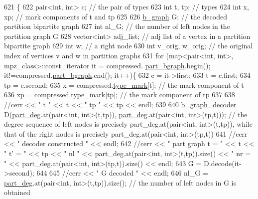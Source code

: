 \begin{DoxyCode}
621 \{
622   pair<int, int> c; \textcolor{comment}{// the pair of types}
623   \textcolor{keywordtype}{int} t, tp; \textcolor{comment}{// types}
624   \textcolor{keywordtype}{int} x, xp; \textcolor{comment}{// mark components of t and tp}
625 
626   \hyperlink{classb__graph}{b\_graph} G; \textcolor{comment}{// the decoded partition bipartite graph}
627   \textcolor{keywordtype}{int} nl\_G; \textcolor{comment}{// the number of left nodes in the partition graph G }
628   vector<int> adj\_list; \textcolor{comment}{// adj list of a vertex in a partition bipartite graph}
629   \textcolor{keywordtype}{int} w; \textcolor{comment}{// a right node}
630   \textcolor{keywordtype}{int} v\_orig, w\_orig; \textcolor{comment}{// the original index of vertices v and w in partition graphs }
631   \textcolor{keywordflow}{for} (map<pair<int, int>, mpz\_class>::const\_iterator it = compressed.
      \hyperlink{classmarked__graph__compressed_a7b3267063fba30b45eb21b3ba4e07536}{part\_bgraph}.begin(); it!=compressed.\hyperlink{classmarked__graph__compressed_a7b3267063fba30b45eb21b3ba4e07536}{part\_bgraph}.end(); it++)\{
632     c = it->first;
633     t = c.first;
634     tp = c.second;
635     x = compressed.\hyperlink{classmarked__graph__compressed_a86b00223525703e973415cbc9c94da68}{type\_mark}[t]; \textcolor{comment}{// the mark component of t}
636     xp = compressed.\hyperlink{classmarked__graph__compressed_a86b00223525703e973415cbc9c94da68}{type\_mark}[tp]; \textcolor{comment}{// the mark component of tp }
637 
638     \textcolor{comment}{//cerr << " t " << t << " tp " << tp << endl;}
639 
640     \hyperlink{classb__graph__decoder}{b\_graph\_decoder} D(\hyperlink{classmarked__graph__decoder_a6882e96fcad9abb10e72f1398814824a}{part\_deg}.at(pair<int, int>(t,tp)), 
      \hyperlink{classmarked__graph__decoder_a6882e96fcad9abb10e72f1398814824a}{part\_deg}.at(pair<int, int>(tp,t))); \textcolor{comment}{// the degree sequence of left nodes is precisely
       part\_deg.at(pair<int, int>(t,tp)), while that of the right nodes is precisely part\_deg.at(pair<int, int>(tp,t))}
641     \textcolor{comment}{//cerr << " decoder constructed " << endl;}
642     \textcolor{comment}{//cerr << " part graph t = "  << t << " t' = " << tp << " nl " << part\_deg.at(pair<int,
       int>(t,tp)).size() << " nr = " << part\_deg.at(pair<int, int>(tp,t)).size() << endl;}
643     G = D.decode(it->second);
644 
645     \textcolor{comment}{//cerr << " G decoded " << endl;}
646     nl\_G = \hyperlink{classmarked__graph__decoder_a6882e96fcad9abb10e72f1398814824a}{part\_deg}.at(pair<int, int>(t,tp)).size(); \textcolor{comment}{// the number of left nodes in G is obtained
}
\end{DoxyCode}
